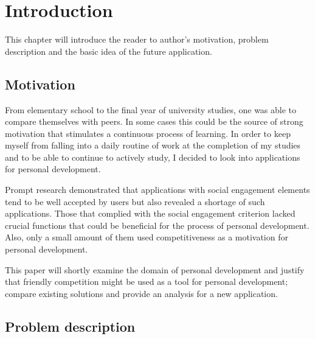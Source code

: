 

\chapter{Introduction}\label{ch:introduction}

This chapter will introduce the reader to author's motivation, problem description and the basic idea of the future application.


\section{Motivation}\label{sec:introduction-motivation}

From elementary school to the final year of university studies, one was able to compare themselves with peers.
In some cases this could be the source of strong motivation that stimulates a continuous process of learning.
In order to keep myself from falling into a daily routine of work at the completion of my studies and to be able to continue to actively study, I decided to look
into applications for personal development.

Prompt research demonstrated that applications with social engagement elements tend to be well accepted by users
but also revealed a shortage of such applications.
Those that complied with the social engagement criterion lacked crucial functions that could be beneficial for the process of personal development.
Also, only a small amount of them used competitiveness as a motivation for personal development.

 This paper will shortly examine the domain of personal development and justify that friendly competition might be used as a tool for personal development;
compare existing solutions and provide an analysis for a new application.


\section{Problem description}\label{sec:problem-description}


